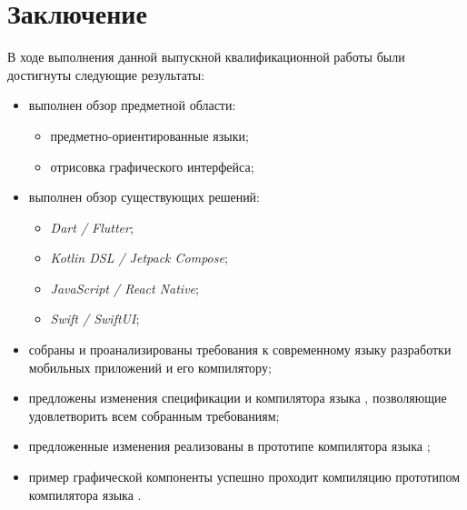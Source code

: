 \section{Заключение}
В ходе выполнения данной выпускной квалификационной работы были достигнуты
следующие результаты:
\begin{itemize}
	\item выполнен обзор предметной области:
		\begin{itemize}
			\item предметно-ориентированные языки;
			\item отрисовка графического интерфейса;
		\end{itemize}
	\item выполнен обзор существующих решений:
		\begin{itemize}
			\item \textit{Dart / Flutter};
			\item \textit{Kotlin DSL / Jetpack Compose};
			\item \textit{JavaScript / React Native};
			\item \textit{Swift / SwiftUI};
		\end{itemize}
	\item собраны и проанализированы требования к современному языку
	разработки мобильных приложений и его компилятору;
	\item предложены изменения спецификации и компилятора языка
	, позволяющие удовлетворить всем собранным требованиям;
	\item предложенные изменения реализованы в прототипе компилятора
	языка ;
	\item пример графической компоненты успешно проходит компиляцию
	прототипом компилятора языка .
\end{itemize}

